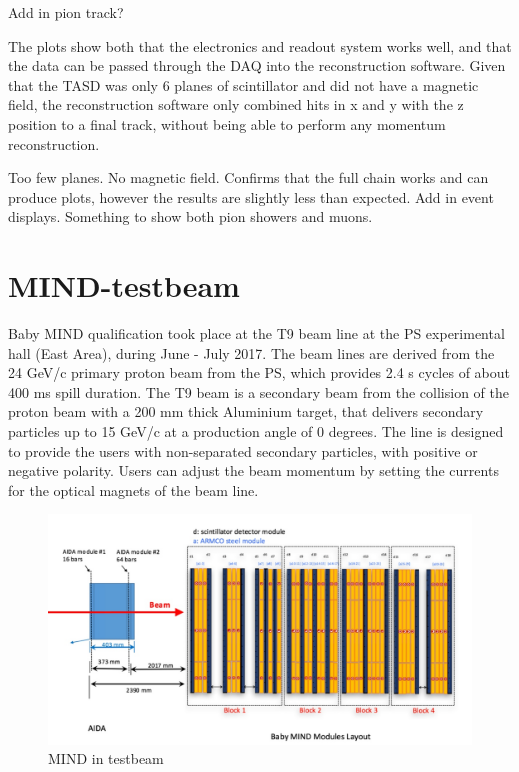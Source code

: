 Add in pion track?

The plots show both that the electronics and readout system works well, and that the data can be passed through the DAQ into the reconstruction software. Given that the TASD was only 6 planes of scintillator and did not have a magnetic field, the reconstruction software only combined hits in x and y with the z position to a final track, without being able to perform any momentum reconstruction.

Too few planes. No magnetic field. Confirms that the full chain works and can produce plots, however the results are slightly less than expected. Add in event displays. Something to show both pion showers and muons.



\section{MIND-testbeam}

Baby MIND qualification took place at the T9 beam line at the PS experimental hall (East Area), during June - July 2017. The beam lines are derived from the 24 GeV/c primary proton beam from the PS, which provides 2.4 s cycles of about 400 ms spill duration. The T9 beam is a secondary beam from the collision of the proton beam with a 200 mm thick Aluminium target, that delivers secondary particles up to 15 GeV/c at a production angle of 0 degrees. The line is designed to provide the users with non-separated secondary particles, with positive or negative polarity. Users can adjust the beam momentum by setting the currents for the optical magnets of the beam line.

\begin{figure}[h!]
\centering
\includegraphics[width=\textwidth]{figures/MINDAIDAtestbeam.jpeg}
\caption{MIND in testbeam}
\label{fig:MINDtb}
\end{figure}

